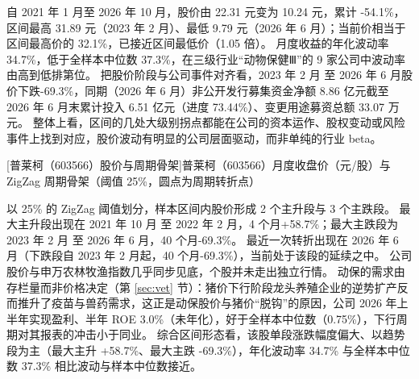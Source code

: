  自 2021 年 1 月至 2026 年 10 月，股价由 22.31 元变为 10.24 元，累计 -54.1\%，区间最高 31.89 元（2023 年 2 月）、最低 9.79 元（2026 年 6 月）；当前价相当于区间最高价的 32.1\%，已接近区间最低价（1.05 倍）。 月度收益的年化波动率 34.7\%，低于全样本中位数 37.3\%，在三级行业“动物保健Ⅲ”的 9 家公司中波动率由高到低排第位。 把股价阶段与公司事件对齐看，2023 年 2 月 至 2026 年 6 月股价下跌-69.3\%，同期（2026 年 6 月）非公开发行募集资金净额 8.86 亿元截至 2026 年 6 月末累计投入 6.51 亿元（进度 73.44\%）、变更用途募资总额 33.07 万元。 整体上看，区间的几处大级别拐点都能在公司的资本运作、股权变动或风险事件上找到对应，股价波动有明显的公司层面驱动，而非单纯的行业 beta。

\begin{center}
\begin{minipage}{\textwidth}\centering
{}

[普莱柯（603566）股价与周期骨架]{普莱柯（603566）月度收盘价（元/股）与 ZigZag 周期骨架（阈值 25\%，圆点为周期转折点）}
\end{minipage}
\end{center}

 以 25\% 的 ZigZag 阈值划分，样本区间内股价形成 2 个主升段与 3 个主跌段。 最大主升段出现在 2021 年 10 月 至 2022 年 2 月，4 个月+58.7\%；最大主跌段为 2023 年 2 月 至 2026 年 6 月，40 个月-69.3\%。 最近一次转折出现在 2026 年 6 月（下跌段自 2023 年 2 月起，40 个月-69.3\%），当前处于该段的延续之中。 公司股价与申万农林牧渔指数几乎同步见底，个股并未走出独立行情。 动保的需求由存栏量而非价格决定（第 \ref{sec:vet} 节）：猪价下行阶段龙头养殖企业的逆势扩产反而推升了疫苗与兽药需求，这正是动保股价与猪价“脱钩”的原因，公司 2026 年上半年实现盈利、半年 ROE 3.0\%（未年化），好于全样本中位数（0.75\%），下行周期对其报表的冲击小于同业。 综合区间形态看，该股单段涨跌幅度偏大、以趋势段为主（最大主升 +58.7\%、最大主跌 -69.3\%），年化波动率 34.7\% 与全样本中位数 37.3\% 相比波动与样本中位数接近。

